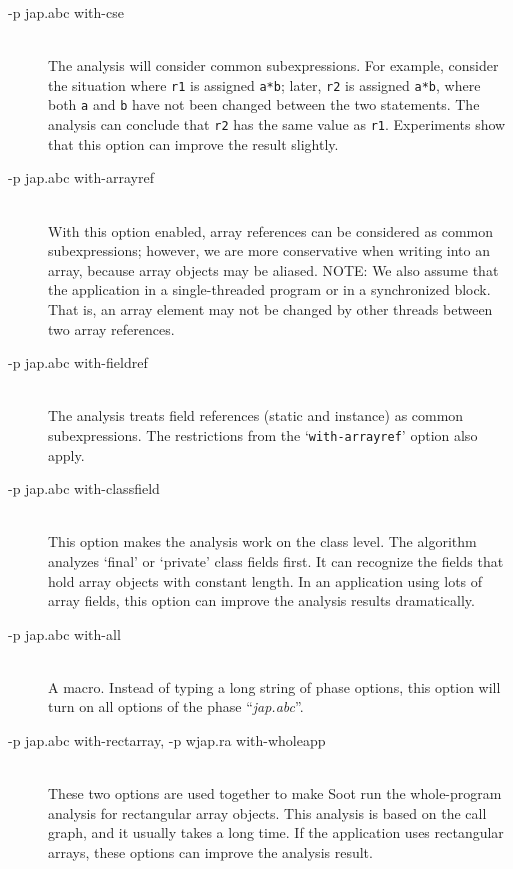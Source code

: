 \documentclass{article}
\begin{document}
\begin{description}

\item[-p jap.abc with-cse]\ \\ 
The analysis will consider common subexpressions.  For example,
  consider the situation where {\tt r1} is assigned {\tt a*b}; later,
  {\tt r2} is assigned {\tt a*b}, where both {\tt a} and {\tt b} have
  not been changed between the two statements. The analysis can
  conclude that {\tt r2} has the same value as {\tt r1}. Experiments
  show that this option can improve the result slightly.

\item[-p jap.abc with-arrayref]\ \\ With this option enabled, array
references can be considered as common subexpressions; however, we are
more conservative when writing into an array, because array
objects may be aliased. NOTE: We also assume that the application in a
single-threaded program or in a synchronized block. That is, an
array element may not be changed by other threads between two array
references.

\item[-p jap.abc with-fieldref]\ \\ 
The analysis treats field references (static and instance) as common
subexpressions. The restrictions from the `{\tt with-arrayref}' option also
apply. 

\item[-p jap.abc with-classfield]\ \\ 
This option makes the analysis work on the class level. The algorithm 
analyzes `final' or `private' class fields first. It can recognize
the fields that hold array objects with constant length.  In an application 
using lots of array fields, this option can improve the analysis results 
dramatically. 

\item[-p jap.abc with-all]\ \\
A macro.  Instead of typing a long string of phase options, this option 
will turn on all options of the phase ``{\em jap.abc}''.
 
\item[-p jap.abc with-rectarray, -p wjap.ra with-wholeapp]\ \\ These
two options are used together to make Soot run the whole-program
analysis for rectangular array objects. This analysis is based on the
call graph, and it usually takes a long time. If the application uses
rectangular arrays, these options can improve the analysis
result.

\end{description}
\end{document}
